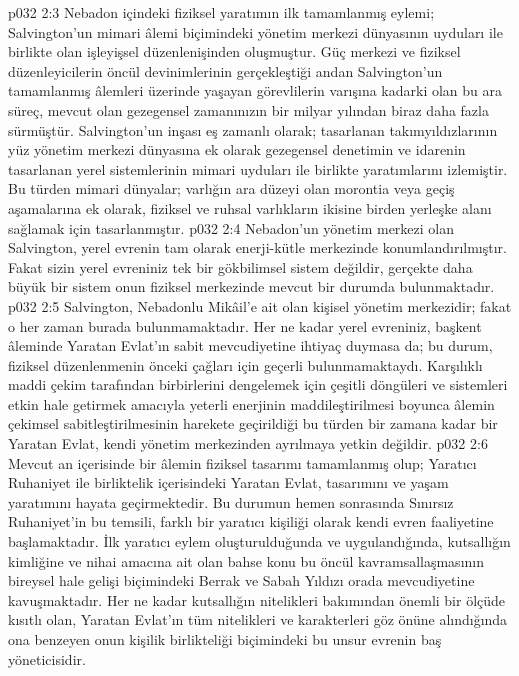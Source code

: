 \vs p032 2:3 Nebadon içindeki fiziksel yaratımın ilk tamamlanmış eylemi; Salvington’un mimari âlemi biçimindeki yönetim merkezi dünyasının uyduları ile birlikte olan işleyişsel düzenlenişinden oluşmuştur. Güç merkezi ve fiziksel düzenleyicilerin öncül devinimlerinin gerçekleştiği andan Salvington’un tamamlanmış âlemleri üzerinde yaşayan görevlilerin varışına kadarki olan bu ara süreç, mevcut olan gezegensel zamanınızın bir milyar yılından biraz daha fazla sürmüştür. Salvington’un inşası eş zamanlı olarak; tasarlanan takımyıldızlarının yüz yönetim merkezi dünyasına ek olarak gezegensel denetimin ve idarenin tasarlanan yerel sistemlerinin mimari uyduları ile birlikte yaratımlarını izlemiştir. Bu türden mimari dünyalar; varlığın ara düzeyi olan morontia veya geçiş aşamalarına ek olarak, fiziksel ve ruhsal varlıkların ikisine birden yerleşke alanı sağlamak için tasarlanmıştır.
\vs p032 2:4 Nebadon’un yönetim merkezi olan Salvington, yerel evrenin tam olarak enerji\hyp{}kütle merkezinde konumlandırılmıştır. Fakat sizin yerel evreniniz tek bir gökbilimsel sistem değildir, gerçekte daha büyük bir sistem onun fiziksel merkezinde mevcut bir durumda bulunmaktadır.
\vs p032 2:5 Salvington, Nebadonlu Mikâil’e ait olan kişisel yönetim merkezidir; fakat o her zaman burada bulunmamaktadır. Her ne kadar yerel evreniniz, başkent âleminde Yaratan Evlat’ın sabit mevcudiyetine ihtiyaç duymasa da; bu durum, fiziksel düzenlenmenin önceki çağları için geçerli bulunmamaktaydı. Karşılıklı maddi çekim tarafından birbirlerini dengelemek için çeşitli döngüleri ve sistemleri etkin hale getirmek amacıyla yeterli enerjinin maddileştirilmesi boyunca âlemin çekimsel sabitleştirilmesinin harekete geçirildiği bu türden bir zamana kadar bir Yaratan Evlat, kendi yönetim merkezinden ayrılmaya yetkin değildir.
\vs p032 2:6 Mevcut an içerisinde bir âlemin fiziksel tasarımı tamamlanmış olup; Yaratıcı Ruhaniyet ile birliktelik içerisindeki Yaratan Evlat, tasarımını ve yaşam yaratımını hayata geçirmektedir. Bu durumun hemen sonrasında Sınırsız Ruhaniyet’in bu temsili, farklı bir yaratıcı kişiliği olarak kendi evren faaliyetine başlamaktadır. İlk yaratıcı eylem oluşturulduğunda ve uygulandığında, kutsallığın kimliğine ve nihai amacına ait olan bahse konu bu öncül kavramsallaşmasının bireysel hale gelişi biçimindeki Berrak ve Sabah Yıldızı orada mevcudiyetine kavuşmaktadır. Her ne kadar kutsallığın nitelikleri bakımından önemli bir ölçüde kısıtlı olan, Yaratan Evlat’ın tüm nitelikleri ve karakterleri göz önüne alındığında ona benzeyen onun kişilik birlikteliği biçimindeki bu unsur evrenin baş yöneticisidir.
